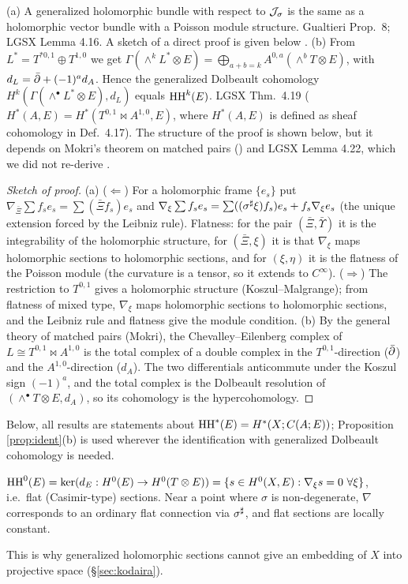 \begin{prop}[Generalized holomorphic bundle $=$ Poisson module; Dolbeault model]\label{prop:ident}
(a) A generalized holomorphic bundle with respect to $\mathcal J_\sigma$ is the same as a holomorphic vector bundle with a Poisson module structure. \tC Gualtieri \cite{GuaBr} Prop.~8; LGSX Lemma 4.16. A sketch of a direct proof is given below \tP.
(b) From $L^*=T^{*0,1}\oplus T^{1,0}$ we get $\Gamma(\wedge^kL^*\otimes E)=\bigoplus_{a+b=k}A^{0,a}(\wedge^bT\otimes E)$, with $d_L=\bar\partial+(-1)^ad_A$. Hence the generalized Dolbeault cohomology $H^k(\Gamma(\wedge^\bullet L^*\otimes E),d_L)$ equals $\mathrm{HH}^k(E)$. \tC LGSX Thm.~4.19 ($H^*(A,E)=H^*(T^{0,1}\bowtie A^{1,0},E)$, where $H^*(A,E)$ is defined as sheaf cohomology in Def.~4.17). \tP The structure of the proof is shown below, but it depends on Mokri's theorem on matched pairs (\cite{Mok}) and LGSX Lemma 4.22, which we did not re-derive \tQ.
\end{prop}
\begin{proof}[Sketch of proof]
(a) ($\Leftarrow$) For a holomorphic frame $\{e_s\}$ put $\nabla_{\bar\Xi}\sum f_se_s=\sum(\bar\Xi f_s)e_s$ and $\nabla_\xi\sum f_se_s=\sum((\sigma^\sharp\xi)f_s)e_s+f_s\nabla_\xi e_s$ (the unique extension forced by the Leibniz rule). Flatness: for the pair $(\bar\Xi,\bar\Upsilon)$ it is the integrability of the holomorphic structure, for $(\bar\Xi,\xi)$ it is that $\nabla_\xi$ maps holomorphic sections to holomorphic sections, and for $(\xi,\eta)$ it is the flatness of the Poisson module (the curvature is a tensor, so it extends to $C^\infty$). ($\Rightarrow$) The restriction to $T^{0,1}$ gives a holomorphic structure (Koszul--Malgrange); from flatness of mixed type, $\nabla_\xi$ maps holomorphic sections to holomorphic sections, and the Leibniz rule and flatness give the module condition.
(b) By the general theory of matched pairs (Mokri), the Chevalley--Eilenberg complex of $L\cong T^{0,1}\bowtie A^{1,0}$ is the total complex of a double complex in the $T^{0,1}$-direction ($\bar\partial$) and the $A^{1,0}$-direction ($d_A$). The two differentials anticommute under the Koszul sign $(-1)^a$, and the total complex is the Dolbeault resolution of $(\wedge^\bullet T\otimes E,d_A)$, so its cohomology is the hypercohomology. \qedhere
\end{proof}
Below, all results are statements about $\mathrm{HH}^*(E)=H^*(X;C(A;E))$; Proposition \ref{prop:ident}(b) is used wherever the identification with generalized Dolbeault cohomology is needed.

\begin{obs}\tP\label{obs:casimir}
$\mathrm{HH}^0(E)=\ker(d_E:H^0(E)\to H^0(T\otimes E))=\{s\in H^0(X,E):\nabla_\xi s=0\ \forall\xi\}$, i.e.\ flat (Casimir-type) sections. Near a point where $\sigma$ is non-degenerate, $\nabla$ corresponds to an ordinary flat connection via $\sigma^\sharp$, and flat sections are locally constant.
\end{obs}
This is why generalized holomorphic sections cannot give an embedding of $X$ into projective space (\S\ref{sec:kodaira}).

